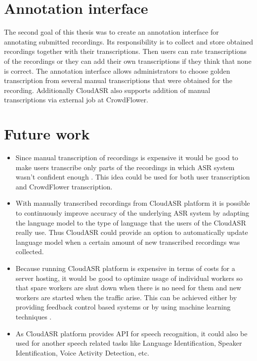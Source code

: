\section*{Annotation interface}
The second goal of this thesis was to create an annotation interface for annotating submitted recordings.
Its responsibility is to collect and store obtained recordings together with their transcriptions.
Then users can rate transcriptions of the recordings
  or they can add their own transcriptions
  if they think that none is correct.
The annotation interface allows administrators to choose golden transcription from several manual transcriptions
  that were obtained for the recording.
Additionally CloudASR also supports addition of manual transcriptions via external job at CrowdFlower.

\section*{Future work}
\begin{itemize}
  \item
    Since manual transcription of recordings is expensive
      it would be good to make users transcribe only parts of the recordings
      in which ASR system wasn't confident enough \cite{sperber2014fly}.
    This idea could be used for both user transcription and CrowdFlower transcription.

  \item
    With manually transcribed recordings from CloudASR platform
      it is possible to continuously improve accuracy of the underlying ASR system
      by adapting the language model to the type of language that the users of the CloudASR really use.
    Thus CloudASR could provide an option to automatically update language model
      when a certain amount of new transcribed recordings was collected.

  \item
    Because running CloudASR platform is expensive in terms of costs for a server hosting,
      it would be good to optimize usage of individual workers
      so that spare workers are shut down when there is no need for them
      and new workers are started when the traffic arise.
    This can be achieved either by providing feedback control based systems \cite{janert2013feedback}
      or by using machine learning techniques \cite{gong2010press}.

  \item
    As CloudASR platform provides API for speech recognition,
      it could also be used for another speech related tasks like Language Identification, Speaker Identification, Voice Activity Detection, etc.

\end{itemize}


